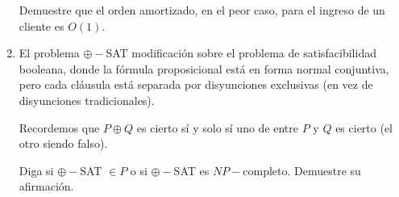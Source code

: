 \documentclass[letterpaper, 12pt]{article}
\begin{document}
\begin{enumerate}
Demuestre que el orden amortizado, en el peor caso, para el ingreso de un cliente es $O(1)$. \\

\item El problema $\oplus-$SAT modificación sobre el problema de satisfacibilidad booleana, donde la fórmula proposicional está en forma normal conjuntiva, pero cada cláusula está separada por disyunciones exclusivas (en vez de disyunciones tradicionales).

Recordemos que $P \oplus Q$ es cierto sí y solo sí uno de entre $P$ y $Q$ es cierto (el otro siendo falso).

Diga si $\oplus-$SAT $\in P$ o si $\oplus-$SAT es $NP-$completo. Demuestre su afirmación.

\end{enumerate} \vspace{4mm}
\end{document}
